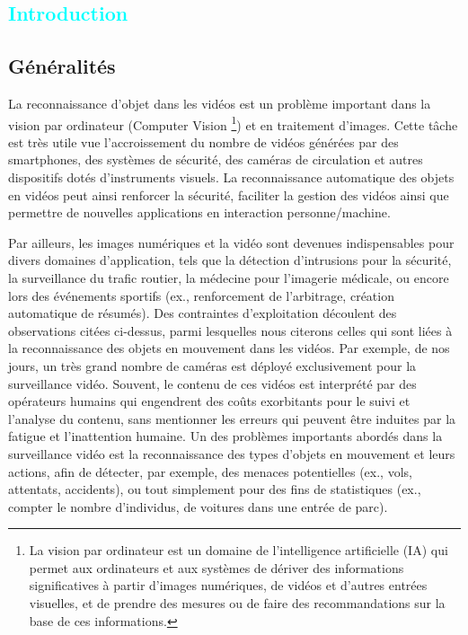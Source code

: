 

\textcolor{cyan}{\chapter{Introduction}}
	\section{Généralités}

		La reconnaissance d'objet dans les vidéos est un problème important dans la vision par ordinateur (Computer Vision \footnote{La vision par ordinateur est un domaine de l'intelligence artificielle (IA) qui permet aux ordinateurs et aux systèmes de dériver des informations significatives à partir d'images numériques, de vidéos et d'autres entrées visuelles, et de prendre des mesures ou de faire des recommandations sur la base de ces informations.}) et en traitement d'images. Cette tâche est très utile vue l'accroissement du nombre de vidéos générées par des smartphones, des systèmes de sécurité, des caméras de circulation et autres dispositifs dotés d'instruments visuels. La reconnaissance automatique des objets en vidéos peut ainsi renforcer la sécurité, faciliter la gestion des vidéos ainsi que permettre de nouvelles applications en interaction personne/machine.
		
		Par ailleurs, les images numériques et la vidéo sont devenues indispensables pour divers domaines d'application, tels que la détection d'intrusions pour la sécurité, la surveillance du trafic routier, la médecine pour l'imagerie médicale, ou encore lors des événements sportifs (ex., renforcement de l'arbitrage, création automatique de résumés).
		Des contraintes d'exploitation découlent des observations citées ci-dessus, parmi lesquelles nous citerons celles qui sont liées à la reconnaissance des objets en mouvement dans les vidéos. Par exemple, de nos jours, un très grand nombre de caméras est déployé exclusivement pour la surveillance vidéo.\cite{ahadjitse2013reconnaissance} 
		Souvent, le contenu de ces vidéos est interprété par des opérateurs humains qui engendrent des coûts exorbitants pour le suivi et l'analyse du contenu, sans mentionner les erreurs qui peuvent être induites par la fatigue et l'inattention humaine. 
		Un des problèmes importants abordés dans la surveillance vidéo est la reconnaissance des types d'objets en mouvement et leurs actions, afin de détecter, par exemple, des menaces potentielles (ex., vols, attentats, accidents), ou tout simplement pour des fins de statistiques (ex., compter le nombre d'individus, de voitures dans une entrée de parc).
		
